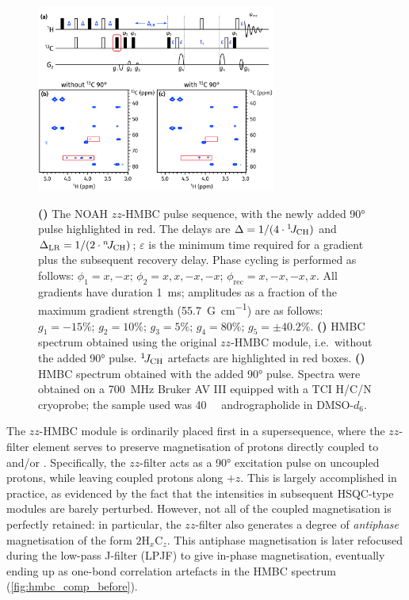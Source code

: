 \documentclass[a4paper,11pt]{article}
\newcommand{\carbon}{\ce{^{13}C}}
\newcommand{\nitrogen}{\ce{^{15}N}}
\newcommand{\onejch}{{}^1\!J_{\ce{CH}}}
\newcommand{\njch}{{}^n\!J_{\ce{CH}}}
\newcommand*{\andro}{Spectra were obtained on a \SI{700}{\MHz} Bruker AV III equipped with a TCI H/C/N cryoprobe; the sample used was \SI{40}{\milli\molar} andrographolide in DMSO-$d_6$.}
\begin{document}
\begin{figure}[ht]
    \centering
    \includegraphics[width=0.7\textwidth]{hmbc_comp.png}
    {\label{fig:hmbc_comp_pulprog}}
    {\label{fig:hmbc_comp_before}}
    {\label{fig:hmbc_comp_after}}
    \caption{
        \textbf{()} The NOAH $zz$-HMBC pulse sequence, with the newly added \carbon{} \ang{90} pulse highlighted in red.
        The delays are $\Delta = 1/(4 \cdot \onejch)$ and $\Delta_{\text{LR}} = 1/(2 \cdot \njch)$; $\varepsilon$ is the minimum time required for a gradient plus the subsequent recovery delay.
        Phase cycling is performed as follows: $\phi_1 = x, -x$; $\phi_2 = x, x, -x, -x$; $\phi_{\text{rec}} = x, -x, -x, x$.
        All gradients have duration \SI{1}{ms}; amplitudes as a fraction of the maximum gradient strength (\SI{55.7}{G\per\cm}) are as follows: $g_1 = -15\%$; $g_2 = 10\%$; $g_3 = 5\%$; $g_4 = 80\%$; $g_5 = \pm 40.2\%$.
        \textbf{()} HMBC spectrum obtained using the original $zz$-HMBC module, i.e.\ without the added \ang{90} pulse.
        $\onejch{}$ artefacts are highlighted in red boxes.
        \textbf{()} HMBC spectrum obtained with the added \ang{90} pulse.
        \andro{}
    }
    \label{fig:hmbc_comp}
\end{figure}

The $zz$-HMBC module is ordinarily placed first in a supersequence, where the $zz$-filter element serves to preserve magnetisation of protons directly coupled to \carbon{} and/or \nitrogen{}.\autocite{Kupce2018CC,Kupce2019JMR}
Specifically, the $zz$-filter acts as a \ang{90} excitation pulse on uncoupled protons, while leaving coupled protons along $+z$.
This is largely accomplished in practice, as evidenced by the fact that the intensities in subsequent HSQC-type modules are barely perturbed.
However, not all of the coupled magnetisation is perfectly retained: in particular, the $zz$-filter also generates a degree of \textit{antiphase} magnetisation of the form $2\mathrm{H}_x\mathrm{C}_z$.
This antiphase magnetisation is later refocused during the low-pass J-filter (LPJF) to give in-phase magnetisation, eventually ending up as one-bond correlation artefacts in the HMBC spectrum (\cref{fig:hmbc_comp_before}).
\end{document}
